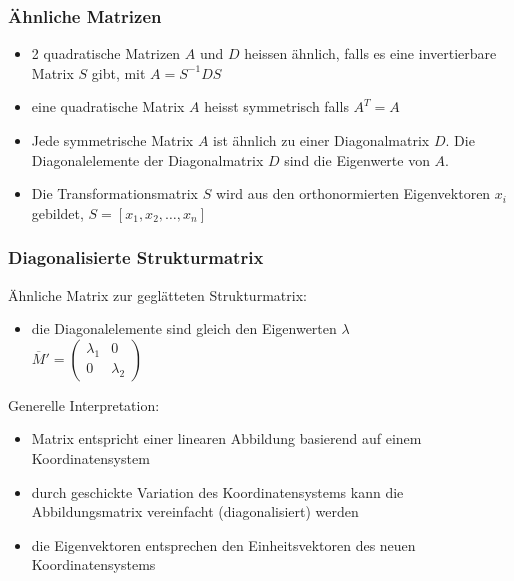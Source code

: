 \documentclass[10pt]{article}
\begin{document}
\subsubsection{Ähnliche Matrizen}
\begin{itemize}
	\item 2 quadratische Matrizen $A$ und $D$ heissen ähnlich, falls es eine invertierbare Matrix $S$ gibt, mit $A=S^{-1}DS$
	\item eine quadratische Matrix $A$ heisst symmetrisch falls $A^T=A$
	\item Jede symmetrische Matrix $A$ ist ähnlich zu einer Diagonalmatrix $D$.  Die Diagonalelemente der Diagonalmatrix $D$ sind die Eigenwerte von $A$.
	\item Die Transformationsmatrix $S$ wird aus den orthonormierten Eigenvektoren $x_i$ gebildet, $S = [x_1,x_2, \dots, x_n]$
\end{itemize}
\subsubsection{Diagonalisierte Strukturmatrix}
Ähnliche Matrix zur geglätteten Strukturmatrix:
\begin{itemize}
	\item die Diagonalelemente sind gleich den Eigenwerten $\lambda$ \\
	$\overline{M}' = \begin{pmatrix}
	\lambda_1 & 0 \\
	0 & \lambda_2
	\end{pmatrix}$
\end{itemize}
Generelle Interpretation:
\begin{itemize}
	\item Matrix entspricht einer linearen Abbildung basierend auf einem Koordinatensystem
	\item durch geschickte Variation des Koordinatensystems kann die Abbildungsmatrix vereinfacht (diagonalisiert) werden
	\item die Eigenvektoren entsprechen den Einheitsvektoren des neuen Koordinatensystems
\end{itemize}
\end{document}
